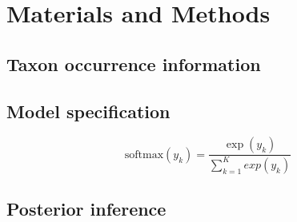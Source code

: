 \documentclass[12pt,letterpaper]{article}
\begin{document}
\section{Materials and Methods}

\subsection{Taxon occurrence information}


\subsection{Model specification}


\begin{equation}
  \mathrm{softmax}(y_k) = \frac{\exp(y_k)}{\sum_{k = 1}^{K} exp(y_{k})}
  \label{eq:softmax}
\end{equation}



\subsection{Posterior inference}
\end{document}
